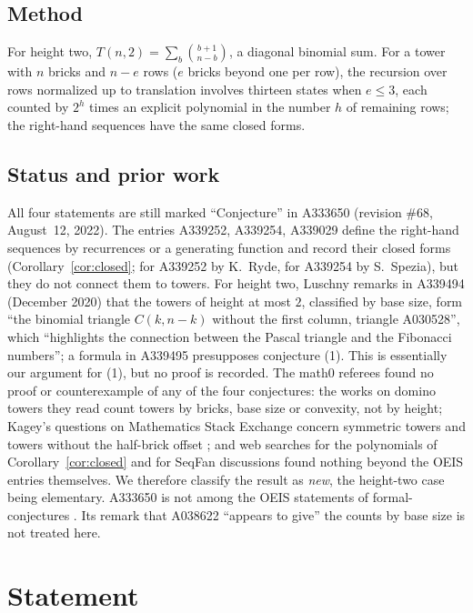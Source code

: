 \documentclass[11pt]{amsart}
\theoremstyle{plain}
\theoremstyle{definition}
\begin{document}
\subsection*{Method}
For height two, $T(n,2)=\sum_b\binom{b+1}{n-b}$, a diagonal binomial sum. For a tower with $n$ bricks and $n-e$ rows ($e$ bricks beyond one per row), the recursion over rows normalized up to translation involves thirteen states when $e\le3$, each counted by $2^h$ times an explicit polynomial in the number $h$ of remaining rows; the right-hand sequences have the same closed forms.

\subsection*{Status and prior work}
All four statements are still marked ``Conjecture'' in A333650 (revision \#68, August~12, 2022).
The entries A339252, A339254, A339029 \cite{A339252} define the right-hand sequences by recurrences or a generating function and record their closed forms (Corollary~\ref{cor:closed}; for A339252 by K.~Ryde, for A339254 by S.~Spezia), but they do not connect them to towers.
For height two, Luschny remarks in A339494 \cite{A339494} (December 2020) that the towers of height at most $2$, classified by base size, form ``the binomial triangle $C(k, n-k)$ without the first column, triangle A030528'', which ``highlights the connection between the Pascal triangle and the Fibonacci numbers''; a formula in A339495 \cite{A339494} presupposes conjecture (1). This is essentially our argument for (1), but no proof is recorded.
The math0 referees found no proof or counterexample of any of the four conjectures: the works on domino towers they read \cite{GBV,BP,Z,Bona,EZ,Br1,Br2,Ha} count towers by bricks, base size or convexity, not by height; Kagey's questions on Mathematics Stack Exchange concern symmetric towers and towers without the half-brick offset \cite{K1}; and web searches for the polynomials of Corollary~\ref{cor:closed} and for SeqFan discussions found nothing beyond the OEIS entries themselves.
We therefore classify the result as \emph{new}, the height-two case being elementary.
A333650 is not among the OEIS statements of formal-conjectures \cite{FC}. Its remark that A038622 ``appears to give'' the counts by base size is not treated here.

\section{Statement}\label{sec:statement}
\end{document}

